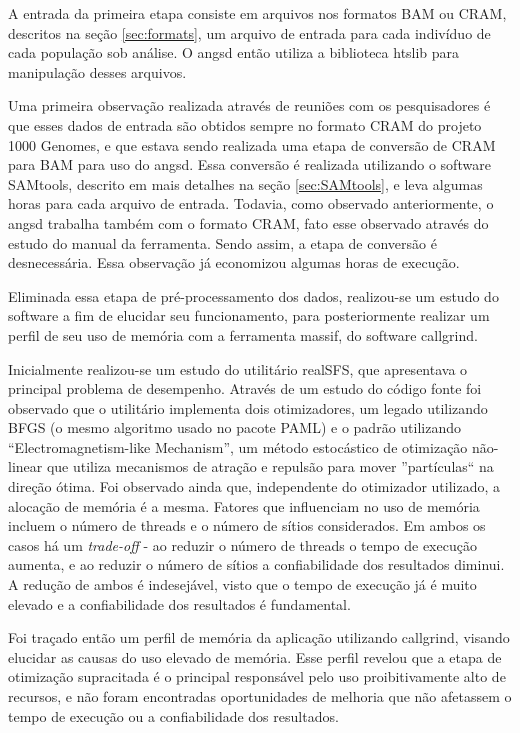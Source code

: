 \documentclass[cic,tc]{iiufrgs}
\begin{document}
A entrada da primeira etapa consiste em arquivos nos formatos BAM ou CRAM,
descritos na seção \ref{sec:formats}, um arquivo de entrada para cada indivíduo
de cada população sob análise. O angsd então utiliza a biblioteca
htslib\cite{bonfield2021htslib} para manipulação desses arquivos.

Uma primeira observação realizada através de reuniões com os pesquisadores é
que esses dados de entrada são obtidos sempre no formato CRAM do projeto 1000
Genomes, e que estava sendo realizada uma etapa de conversão de CRAM para BAM
para uso do angsd. Essa conversão é realizada utilizando o software SAMtools,
descrito em mais detalhes na seção \ref{sec:SAMtools}, e leva algumas horas
para cada arquivo de entrada. Todavia, como observado anteriormente, o angsd
trabalha também com o formato CRAM, fato esse observado através do estudo do
manual da ferramenta. Sendo assim, a etapa de conversão é desnecessária. Essa
observação já economizou algumas horas de execução.

Eliminada essa etapa de pré-processamento dos dados, realizou-se um estudo do
software a fim de elucidar seu funcionamento, para posteriormente realizar um
perfil de seu uso de memória com a ferramenta massif, do software
callgrind.\cite{weidendorfer2008sequential}

Inicialmente realizou-se um estudo do utilitário realSFS, que apresentava o
principal problema de desempenho. Através de um estudo do código fonte foi
observado que o utilitário implementa dois otimizadores, um legado utilizando
BFGS (o mesmo algoritmo usado no pacote PAML) e o padrão utilizando
``Electromagnetism-like Mechanism'', um método estocástico de otimização
não-linear que utiliza mecanismos de atração e repulsão para mover
''partículas`` na direção ótima.\cite{5636954} Foi observado ainda que,
independente do otimizador utilizado, a alocação de memória é a mesma. Fatores
que influenciam no uso de memória incluem o número de threads e o número de
sítios considerados. Em ambos os casos há um \textit{trade-off} - ao reduzir o
número de threads o tempo de execução aumenta, e ao reduzir o número de sítios
a confiabilidade dos resultados diminui.\cite{popgen2016angsd} A redução de
ambos é indesejável, visto que o tempo de execução já é muito elevado e a
confiabilidade dos resultados é fundamental.

Foi traçado então um perfil de memória da aplicação utilizando callgrind,
visando elucidar as causas do uso elevado de memória. Esse perfil revelou que a
etapa de otimização supracitada é o principal responsável pelo uso
proibitivamente alto de recursos, e não foram encontradas oportunidades de
melhoria que não afetassem o tempo de execução ou a confiabilidade dos
resultados.
\end{document}
